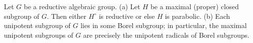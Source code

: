 Let $G$ be a reductive algebraic group.
(a) Let $H$ be a maximal (proper) closed subgroup of $G$. Then either $H^\circ$ is reductive or else $H$ is parabolic.
(b) Each unipotent subgroup of $G$ lies in some Borel subgroup; in particular, the maximal unipotent subgroups of $G$ are precisely the unipotent radicals of Borel subgroups.

